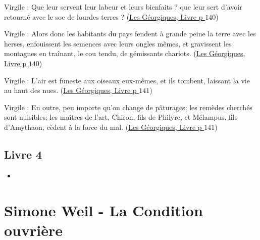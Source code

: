 \documentclass[a4paper, 11pt, hidelinks]{article}
\newcommand{\bs}{\bigskip}
\newcommand{\rb}[1]{\Romanbar{#1}}
\newcommand{\citer}[3]{\bs \begin{center} \textcolor{authorGray}{#1 :} \textcolor{citationRed}{\og #2 \fg} \textcolor{authorGray}{(\underline{#3})} \end{center} \bs}
\begin{document}
\citer{Virgile}{Que leur servent leur labeur et leurs bienfaits ? que leur sert d'avoir retourné avec le soc de lourdes terres ?}{Les Géorgiques, Livre \rb{3} p $140$}


\citer{Virgile}{Alors donc les habitants du pays fendent à grande peine la terre avec les herses, enfouissent les semences avec leurs 
ongles mêmes, et gravissent les montagnes en traînant, le cou tendu, de gémissants chariots.}{Les Géorgiques, Livre \rb{3} p $140$}


\citer{Virgile}{L'air est funeste aux oiseaux eux-mêmes, et ils tombent, laissant la vie au haut des nues.}{Les Géorgiques, Livre \rb{3} p $141$}


\citer{Virgile}{En outre, peu importe qu'on change de pâturages; les remèdes cherchés sont nuisibles; les maîtres de l'art, Chiron,
fils de Philyre, et Mélampus, fils d'Amythaon, cèdent à la force du mal.}{Les Géorgiques, Livre \rb{3} p $141$}





\subsection{Livre 4}


\begin{itemize}
    \item 
\end{itemize}


\section{Simone Weil - La Condition ouvrière}
\end{document}
